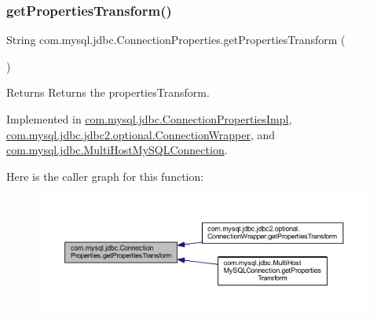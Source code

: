 \subsubsection{\texorpdfstring{get\+Properties\+Transform()}{getPropertiesTransform()}}
{\footnotesize\ttfamily String com.\+mysql.\+jdbc.\+Connection\+Properties.\+get\+Properties\+Transform (\begin{DoxyParamCaption}{ }\end{DoxyParamCaption})}

\begin{DoxyReturn}{Returns}
Returns the properties\+Transform. 
\end{DoxyReturn}


Implemented in \mbox{\hyperlink{classcom_1_1mysql_1_1jdbc_1_1_connection_properties_impl_a4eb7aa6de496a4aa67a85509de9f46a7}{com.\+mysql.\+jdbc.\+Connection\+Properties\+Impl}}, \mbox{\hyperlink{classcom_1_1mysql_1_1jdbc_1_1jdbc2_1_1optional_1_1_connection_wrapper_ab225f27eb5edd605b97f1a646b503144}{com.\+mysql.\+jdbc.\+jdbc2.\+optional.\+Connection\+Wrapper}}, and \mbox{\hyperlink{classcom_1_1mysql_1_1jdbc_1_1_multi_host_my_s_q_l_connection_a209788195dbd1e088e7e245bd783fdc0}{com.\+mysql.\+jdbc.\+Multi\+Host\+My\+S\+Q\+L\+Connection}}.

Here is the caller graph for this function\+:\nopagebreak
\begin{figure}[H]
\begin{center}
\leavevmode
\includegraphics[width=350pt]{interfacecom_1_1mysql_1_1jdbc_1_1_connection_properties_a0d177b2a7b7de4fc521d3362343375de_icgraph}
\end{center}
\end{figure}
\mbox{\label{interfacecom_1_1mysql_1_1jdbc_1_1_connection_properties_aac4f74c781305ad6b2eb71913e184de3}} 
